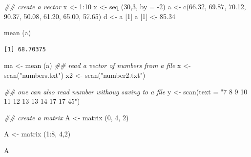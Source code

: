 \documentclass[
  letterpaper,
]{scrbook}
\newenvironment{Shaded}{\begin{snugshade}}{\end{snugshade}}
\newcommand{\AttributeTok}[1]{\textcolor[rgb]{0.40,0.45,0.13}{#1}}
\newcommand{\DecValTok}[1]{\textcolor[rgb]{0.68,0.00,0.00}{#1}}
\newcommand{\DocumentationTok}[1]{\textcolor[rgb]{0.37,0.37,0.37}{\textit{#1}}}
\newcommand{\FloatTok}[1]{\textcolor[rgb]{0.68,0.00,0.00}{#1}}
\newcommand{\FunctionTok}[1]{\textcolor[rgb]{0.28,0.35,0.67}{#1}}
\newcommand{\NormalTok}[1]{\textcolor[rgb]{0.00,0.23,0.31}{#1}}
\newcommand{\OtherTok}[1]{\textcolor[rgb]{0.00,0.23,0.31}{#1}}
\newcommand{\SpecialCharTok}[1]{\textcolor[rgb]{0.37,0.37,0.37}{#1}}
\newcommand{\StringTok}[1]{\textcolor[rgb]{0.13,0.47,0.30}{#1}}
\begin{document}
\begin{Shaded}
\begin{Highlighting}[]
\DocumentationTok{\#\# create a vector}
\NormalTok{x }\OtherTok{\textless{}{-}} \DecValTok{1}\SpecialCharTok{:}\DecValTok{10}
\NormalTok{x }\OtherTok{\textless{}{-}} \FunctionTok{seq}\NormalTok{ (}\DecValTok{30}\NormalTok{,}\DecValTok{3}\NormalTok{, }\AttributeTok{by =} \SpecialCharTok{{-}}\DecValTok{2}\NormalTok{)}
\NormalTok{a }\OtherTok{\textless{}{-}} \FunctionTok{c}\NormalTok{(}\FloatTok{66.32}\NormalTok{, }\FloatTok{69.87}\NormalTok{, }\FloatTok{70.12}\NormalTok{, }\FloatTok{90.37}\NormalTok{, }\FloatTok{50.08}\NormalTok{, }\FloatTok{61.20}\NormalTok{, }\FloatTok{65.00}\NormalTok{, }\FloatTok{57.65}\NormalTok{)}
\NormalTok{d }\OtherTok{\textless{}{-}}\NormalTok{ a [}\DecValTok{1}\NormalTok{]}
\NormalTok{a [}\DecValTok{1}\NormalTok{] }\OtherTok{\textless{}{-}} \FloatTok{85.34}

\FunctionTok{mean}\NormalTok{ (a)}
\end{Highlighting}
\end{Shaded}

\begin{verbatim}
[1] 68.70375
\end{verbatim}

\begin{Shaded}
\begin{Highlighting}[]
\NormalTok{ma }\OtherTok{\textless{}{-}} \FunctionTok{mean}\NormalTok{ (a)}
\DocumentationTok{\#\# read a vector of numbers from a file}
\NormalTok{x }\OtherTok{\textless{}{-}} \FunctionTok{scan}\NormalTok{(}\StringTok{"numbers.txt"}\NormalTok{)}
\NormalTok{x2 }\OtherTok{\textless{}{-}} \FunctionTok{scan}\NormalTok{(}\StringTok{"number2.txt"}\NormalTok{)}

\DocumentationTok{\#\# one can also read number withoug saving to a file}
\NormalTok{y }\OtherTok{\textless{}{-}} \FunctionTok{scan}\NormalTok{(}\AttributeTok{text =} \StringTok{"7  8  9 10 11 12 13 13 14 17 17 45"}\NormalTok{)}

\DocumentationTok{\#\# create a matrix}
\NormalTok{A }\OtherTok{\textless{}{-}} \FunctionTok{matrix}\NormalTok{ (}\DecValTok{0}\NormalTok{, }\DecValTok{4}\NormalTok{, }\DecValTok{2}\NormalTok{)}

\NormalTok{A }\OtherTok{\textless{}{-}} \FunctionTok{matrix}\NormalTok{ (}\DecValTok{1}\SpecialCharTok{:}\DecValTok{8}\NormalTok{, }\DecValTok{4}\NormalTok{,}\DecValTok{2}\NormalTok{)}

\NormalTok{A}
\end{Highlighting}
\end{Shaded}
\end{document}
